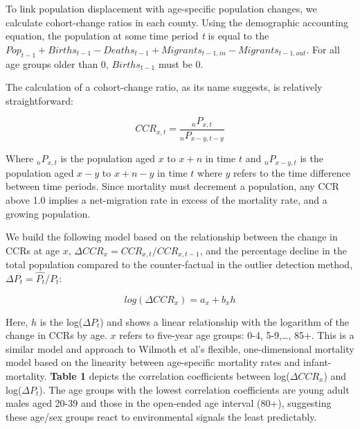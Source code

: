 \documentclass[12pt]{article}
\begin{document}
To link population displacement with age-specific population changes, we
calculate cohort-change ratios in each county. Using the demographic
accounting equation, the population at some time period \emph{t} is
equal to the
\(Pop_{t-1} + Births_{t-1} - Deaths_{t-1} + Migrants_{{t-1},in} - Migrants_{{t-1},out}\).
For all age groups older than 0, \(Births_{t-1}\) must be 0.

The calculation of a cohort-change ratio, as its name suggests, is
relatively straightforward:

\[ 
CCR_{x,t}  =  \frac {_nP_{x,t}} {_nP_{x-y,t-y}}
\]

Where \(_nP_{x,t}\) is the population aged \(x\) to \(x+n\) in time
\(t\) and \(_nP_{x-y,t}\) is the population aged \(x-y\) to \(x+n-y\) in
time \(t\) where \(y\) refers to the time difference between time
periods. Since mortality must decrement a population, any CCR above 1.0
implies a net-migration rate in excess of the mortality rate, and a
growing population.

We build the following model based on the relationship between the
change in CCRs at age \(x\), \(\Delta CCR_x = CCR_{x,t} / CCR_{x,t-1}\),
and the percentage decline in the total population compared to the
counter-factual in the outlier detection method,
\(\Delta P_t = \hat{P_t} / P_t\):

\[
log(\Delta CCR_x) = a_x + b_xh
\]

Here, \(h\) is the log(\(\Delta P_t\)) and shows a linear relationship
with the logarithm of the change in CCRs by age. \(x\) refers to
five-year age groups: 0-4, 5-9,\ldots, 85+. This is a similar model and
approach to Wilmoth et al's \citeyearpar{wilmoth2012flexible} flexible,
one-dimensional mortality model based on the linearity between
age-specific mortality rates and infant-mortality. \textbf{Table 1}
depicts the correlation coefficients between log(\(\Delta CCR_x\)) and
log(\(\Delta P_t\)). The age groups with the lowest correlation
coefficients are young adult males aged 20-39 and those in the
open-ended age interval (80+), suggesting these age/sex groups react to
environmental signals the least predictably.
\end{document}
